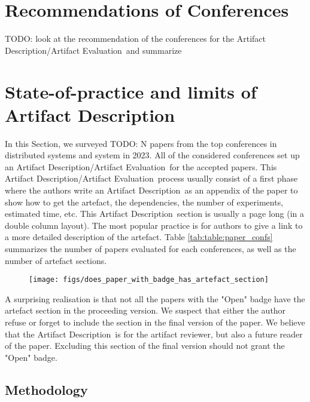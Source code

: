 \documentclass[sigconf]{acmart}
\newcommand{\ad}{Artifact Description}
\newcommand{\aeval}{Artifact Evaluation}
\newcommand{\adae}{\ad/\aeval}
\newcommand{\todo}[1]{{\color{red}TODO: #1}}
\begin{document}
%
\section{Recommendations of Conferences}

\todo{look at the recommendation of the conferences for the \adae\ and summarize}

%
\section{State-of-practice and limits of \ad}\label{sec:sop}



In this Section, we surveyed \todo{N} papers from the top conferences in distributed systems and system in 2023.
All of the considered conferences set up an \adae\ for the accepted papers.
This \adae\ process usually consist of a first phase where the authors write an \ad\ as an appendix of the paper to show how to get the artefact, the dependencies, the number of experiments, estimated time, etc.
This \ad\ section is usually a page long (in a double column layout).
The most popular practice is for authors to give a link to a more detailed description of the artefact.
Table \ref{tab:table:paper_confs} summarizes the number of papers evaluated for each conferences, as well as the number of artefact sections.


\begin{figure}
  \centering
  \texttt{[image: figs/does\_paper\_with\_badge\_has\_artefact\_section]}
  \caption{}\label{fig:}
\end{figure}

A surprising realisation is that not all the papers with the "Open" badge have the artefact section in the proceeding version.
We suspect that either the author refuse or forget to include the section in the final version of the paper.
We believe that the \ad\ is for the artifact reviewer, but also a future reader of the paper.
Excluding this section of the final version should not grant the "Open" badge.

\subsection{Methodology}
\end{document}
